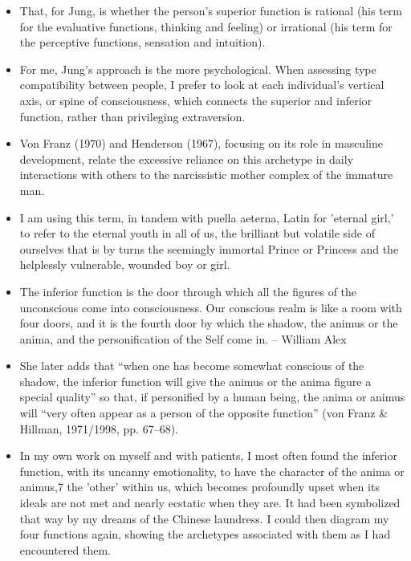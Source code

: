 \begin{itemize}
\item That, for Jung, is whether the person's superior function is rational
(his term for the evaluative functions, thinking and feeling) or irrational
(his term for the perceptive functions, sensation and intuition).

\item For me, Jung's approach is the more psychological. When assessing type
compatibility between people, I prefer to look at each individual's vertical
axis, or spine of consciousness, which connects the superior and inferior
function, rather than privileging extraversion.

\item Von Franz (1970) and Henderson (1967), focusing on its role in masculine
development, relate the excessive reliance on this archetype in daily
interactions with others to the narcissistic mother complex of the immature
man.

\item I am using this term, in tandem with puella aeterna, Latin for 'eternal
girl,' to refer to the eternal youth in all of us, the brilliant but volatile
side of ourselves that is by turns the seemingly immortal Prince or Princess
and the helplessly vulnerable, wounded boy or girl.

\item The inferior function is the door through which all the figures of the
unconscious come into consciousness. Our conscious realm is like a room with
four doors, and it is the fourth door by which the shadow, the animus or the
anima, and the personification of the Self come in. -- William Alex

\item She later adds that ``when one has become somewhat conscious of the
shadow, the inferior function will give the animus or the anima figure a
special quality'' so that, if personified by a human being, the anima or animus
will ``very often appear as a person of the opposite function'' (von Franz \&
Hillman, 1971/1998, pp. 67–68).

\item In my own work on myself and with patients, I most often found the
inferior function, with its uncanny emotionality, to have the character of the
anima or animus,7 the 'other' within us, which becomes profoundly upset when
its ideals are not met and nearly ecstatic when they are. It had been
symbolized that way by my dreams of the Chinese laundress. I could then diagram
my four functions again, showing the archetypes associated with them as I had
encountered them.


\end{itemize}
